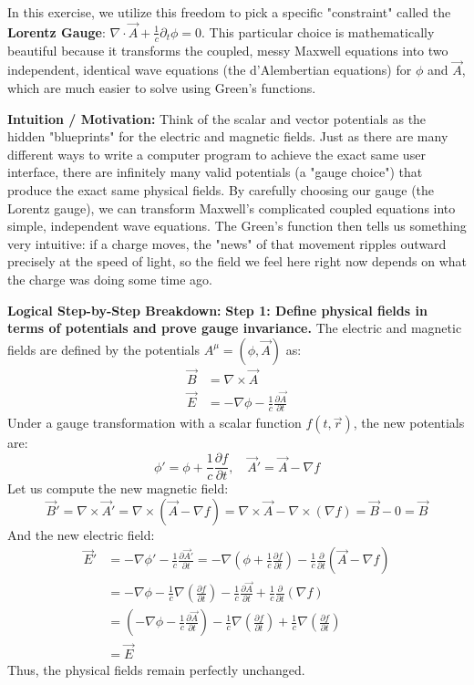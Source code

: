 \begin{solution}
In this exercise, we utilize this freedom to pick a specific "constraint" called the \textbf{Lorentz Gauge}: $\nabla \cdot \vec{A} + \frac{1}{c} \partial_t \phi = 0$. This particular choice is mathematically beautiful because it transforms the coupled, messy Maxwell equations into two independent, identical wave equations (the d'Alembertian equations) for $\phi$ and $\vec{A}$, which are much easier to solve using Green's functions.

\textbf{Intuition / Motivation:}
Think of the scalar and vector potentials as the hidden "blueprints" for the electric and magnetic fields. Just as there are many different ways to write a computer program to achieve the exact same user interface, there are infinitely many valid potentials (a "gauge choice") that produce the exact same physical fields. By carefully choosing our gauge (the Lorentz gauge), we can transform Maxwell's complicated coupled equations into simple, independent wave equations. The Green's function then tells us something very intuitive: if a charge moves, the "news" of that movement ripples outward precisely at the speed of light, so the field we feel here right now depends on what the charge was doing some time ago.

\textbf{Logical Step-by-Step Breakdown:}
\textbf{Step 1: Define physical fields in terms of potentials and prove gauge invariance.}
The electric and magnetic fields are defined by the potentials $A^\mu = (\phi, \vec{A})$ as:
\begin{align*}
    \vec{B} &= \nabla \times \vec{A} \\
    \vec{E} &= -\nabla \phi - \frac{1}{c}\frac{\partial \vec{A}}{\partial t}
\end{align*}
Under a gauge transformation with a scalar function $f(t, \vec{r})$, the new potentials are:
\begin{equation*}
    \phi' = \phi + \frac{1}{c}\frac{\partial f}{\partial t}, \quad \vec{A}' = \vec{A} - \nabla f
\end{equation*}
Let us compute the new magnetic field:
\begin{equation*}
    \vec{B}' = \nabla \times \vec{A}' = \nabla \times (\vec{A} - \nabla f) = \nabla \times \vec{A} - \nabla \times (\nabla f) = \vec{B} - 0 = \vec{B}
\end{equation*}
And the new electric field:
\begin{align*}
    \vec{E}' &= -\nabla \phi' - \frac{1}{c}\frac{\partial \vec{A}'}{\partial t} = -\nabla \left( \phi + \frac{1}{c}\frac{\partial f}{\partial t} \right) - \frac{1}{c}\frac{\partial}{\partial t} \left( \vec{A} - \nabla f \right) \\
    &= -\nabla \phi - \frac{1}{c}\nabla\left(\frac{\partial f}{\partial t}\right) - \frac{1}{c}\frac{\partial \vec{A}}{\partial t} + \frac{1}{c}\frac{\partial}{\partial t}(\nabla f) \\
    &= \left( -\nabla \phi - \frac{1}{c}\frac{\partial \vec{A}}{\partial t} \right) - \frac{1}{c}\nabla\left(\frac{\partial f}{\partial t}\right) + \frac{1}{c}\nabla\left(\frac{\partial f}{\partial t}\right) \\
    &= \vec{E}
\end{align*}
Thus, the physical fields remain perfectly unchanged.


\end{solution}
